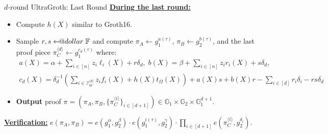 \documentclass{zkdl-presentation-template}
\makeatletter
\newcommand\leftarrowS{\leftarrow\joinrel\smalldollar}
\newcommand{\smalldollar}{\mathrel{\mathpalette\small@dollar\relax}}
\newcommand{\small@dollar}[2]{%
  \vcenter{\hbox{%
    $#1\textnormal{\fontsize{0.7\dimexpr\f@size pt}{0}\selectfont\$}$%
  }}%
}
\makeatother
\begin{document}
    \begin{frame}{$d$-round UltraGroth: Last Round}
        \underline{\textbf{During the last round:}}
        \begin{itemize}
            \item Compute $h(X)$ similar to Groth16.\pause
            \item Sample $r,s \leftarrowS \mathbb{F}$ and compute $\pi_A \gets
            g_1^{a(\tau)}$, $\pi_B \gets g_2^{b(\tau)}$, and the last proof
            piece $\pi_C^{\langle d \rangle} \gets g_1^{c_d(\tau)}$ where:
            \begin{gather*}
                a(X) = \alpha + \sum_{i \in [n]} z_i\ell_i(X) + r\delta_d, \; b(X) = \beta + \sum_{i \in [n]}z_ir_i(X) + s\delta_d, \\
                c_d(X) = \delta_d^{-1}\left(\sum_{i \in \mathcal{I}_W^{\langle d \rangle}}z_if_i(X) + h(X)t_{\Omega}(X)\right) + a(X)s+b(X)r-\sum_{i \in [d]}r_i\delta_i - rs\delta_d
            \end{gather*}
            \pause\item \textbf{Output} proof $\pi = (\pi_A,\pi_B,\{\pi_C^{\langle i
            \rangle}\}_{i \in [d+1]}) \in \mathbb{G}_1 \times \mathbb{G}_2
            \times \mathbb{G}_1^{d+1}$. \pause
        \end{itemize}

        \underline{\textbf{Verification:}} $e(\pi_A,\pi_B) = e(g_1^{\alpha},g_2^{\beta}) \cdot e(g_1^{i(\tau)},g_2^{\gamma}) \cdot \prod_{i \in [d+1]}e(\pi_C^{\langle i \rangle}, g_2^{\delta_i})$.
    \end{frame}
\end{document}
